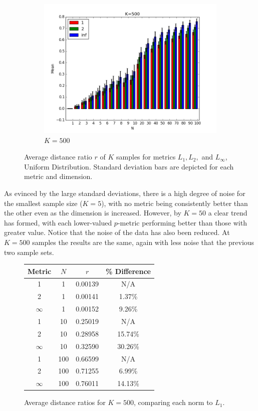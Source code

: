 \documentclass{article}
\begin{document}
\begin{figure}[H]
   \centering
   \ContinuedFloat 
    \begin{subfigure}[h]{0.9\textwidth}
        \includegraphics[width=\textwidth]{l-experiment1-1-500-inf.png}
        \caption{$K=500$}
        \label{fig:exp11k500}
    \end{subfigure}
    \caption{Average distance ratio $r$ of $K$ samples for metrics $L_1,L_2,$ and $L_{\infty}$, Uniform Distribution. Standard deviation bars are depicted for each metric and dimension.}\label{fig:exp11}
\end{figure}
As evinced by the large standard deviations, there is a high degree of noise for the smallest sample size ($K=5$),  with no metric being consistently better than the other even as the dimension is increased. However, by $K=50$ a clear trend has formed, with each lower-valued $p$-metric performing better than those with greater value. Notice that the noise of the data has also been reduced. At $K=500$ samples the results are the same, again with less noise that the previous two sample sets.
\
\begin{figure}[H]
\centering
\begin{tabular}{|c|c|c|c|}
\hline
Metric & $N$ & $r$ & \% Difference\\
\hline
1 & 1 & 0.00139 & N/A\\
2 & 1 & 0.00141 & 1.37\%\\
$\infty$ & 1 & 0.00152 & 9.26\%\\
\hline
1 & 10 & 0.25019 & N/A\\
2 & 10 & 0.28958 & 15.74\%\\
$\infty$ & 10 & 0.32590 & 30.26\%\\
\hline
1 & 100 & 0.66599 & N/A\\
2 & 100 & 0.71255 & 6.99\%\\
$\infty$ & 100 & 0.76011 & 14.13\%\\
\hline
\end{tabular}
\caption{Average distance ratios for $K=500$, comparing each norm to $L_1$.}
\label{fig:exp11data}
\end{figure}
\end{document}

